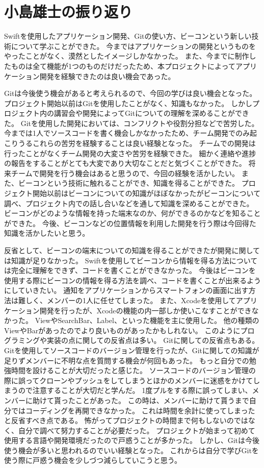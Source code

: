 \documentclass[openany,11pt,papersize]{jsbook}
\begin{document}

\section{小島雄士の振り返り}
Swiftを使用したアプリケーション開発、Gitの使い方、ビーコンという新しい技術について学ぶことができた。
今まではアプリケーションの開発というものをやったことがなく、漠然としたイメージしかなかった。
また、今までに制作したものは全て機能が1つのものだけだったため、本プロジェクトによってアプリケーション開発を経験できたのは良い機会であった。

Gitは今後使う機会があると考えられるので、今回の学びは良い機会となった。
プロジェクト開始以前はGitを使用したことがなく、知識もなかった。
しかしプロジェクト内の講習会や開発によってGitについての理解を深めることができた。
Gitを使用した開発においては、コンフリクトや役割分担などで苦労した。
今までは1人でソースコードを書く機会しかなかったため、チーム開発でのみ起こりうるこれらの苦労を経験することは良い経験となった。
チームでの開発は行ったことがなくチーム開発の大変さや苦労を経験できた。
細かく連絡や進捗の報告をすることがとても大変であり大切なことだと気づくことができた。
将来チームで開発を行う機会はあると思うので、今回の経験を活かしたい。
また、ビーコンという技術に触れることができ、知識を得ることができた。
プロジェクト開始以前はビーコンについての知識がほぼなかったがビーコンについて調べ、プロジェクト内での話し合いなどを通して知識を深めることができた。
ビーコンがどのような情報を持った端末なのか、何ができるのかなどを知ることができた。
今後、ビーコンなどの位置情報を利用した開発を行う際は今回得た知識を活かしたいと思う。

反省として、ビーコンの端末についての知識を得ることができたが開発に関しては知識が足りなかった。
Swiftを使用してビーコンから情報を得る方法については完全に理解をできず、コードを書くことができなかった。
今後はビーコンを使用する際にビーコンの情報を得る方法を調べ、コードを書くことが出来るようにしていきたい。
通知をアプリケーションからスマートフォンの画面に出す方法は難しく、メンバーの1人に任せてしまった。
また、Xcodeを使用してアプリケーション開発を行ったが、Xcodeの機能の内一部しか使いこなすことができなかった。
ViewやSearchBar、Label、といった機能を主に使用した。
他の種類のViewやBarがあったのでより良いものがあったかもしれない。
このようにプログラミングや実装の点に関しての反省点は多い。
Gitに関しての反省点もある。
Gitを使用してソースコードのバージョン管理を行ったが、Gitに関しての知識が足りずメンバーに不明な点を質問する機会が何回もあった。
もっと自分での勉強時間を設けることが大切だったと感じた。
ソースコードのバージョン管理の際に誤ってクローンやプッシュをしてしまうとほかのメンバーに迷惑をかけてしまうので注意することが大切だと学んだ。
1度プルをする際に誤ってしまい、メンバーに助けて貰ったことがあった。
この時は、メンバーに助けて貰うまで自分ではコーディングを再開できなかった。
これは時間を余計に使ってしまったと反省すべき点である。
怖がってプロジェクトの時間まで何もしないのではなく、自分で調べて努力することが必要だった。
プロジェクトが始まって初めて使用する言語や開発環境だったので戸惑うことが多かった。
しかし、Gitは今後使う機会が多いと思われるのでいい経験となった。
これからは自分で学びGitを使う際に戸惑う機会を少しづつ減らしていこうと思う。
\end{document}
